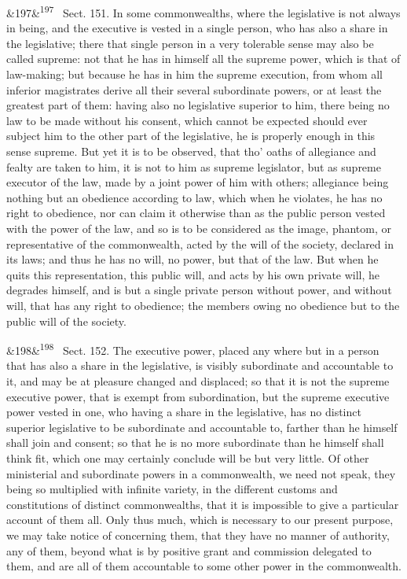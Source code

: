 \documentclass[12pt]{article}
\newcommand{\para}[1][]{\par\noindent\ifx&#1&\else\textsuperscript{\footnotesize #1}~\fi}
\begin{document}
\para[197] Sect. 151. In some commonwealths, where the legislative is not always in being, and the executive is vested in a single person, who has also a share in the legislative; there that single person in a very tolerable sense may also be called supreme: not that he has in himself all the supreme power, which is that of law-making; but because he has in him the supreme execution, from whom all inferior magistrates derive all their several subordinate powers, or at least the greatest part of them: having also no legislative superior to him, there being no law to be made without his consent, which cannot be expected should ever subject him to the other part of the legislative, he is properly enough in this sense supreme. But yet it is to be observed, that tho' oaths of allegiance and fealty are taken to him, it is not to him as supreme legislator, but as supreme executor of the law, made by a joint power of him with others; allegiance being nothing but an obedience according to law, which when he violates, he has no right to obedience, nor can claim it otherwise than as the public person vested with the power of the law, and so is to be considered as the image, phantom, or representative of the commonwealth, acted by the will of the society, declared in its laws; and thus he has no will, no power, but that of the law. But when he quits this representation, this public will, and acts by his own private will, he degrades himself, and is but a single private person without power, and without will, that has any right to obedience; the members owing no obedience but to the public will of the society.

\para[198] Sect. 152. The executive power, placed any where but in a person that has also a share in the legislative, is visibly subordinate and accountable to it, and may be at pleasure changed and displaced; so that it is not the supreme executive power, that is exempt from subordination, but the supreme executive power vested in one, who having a share in the legislative, has no distinct superior legislative to be subordinate and accountable to, farther than he himself shall join and consent; so that he is no more subordinate than he himself shall think fit, which one may certainly conclude will be but very little. Of other ministerial and subordinate powers in a commonwealth, we need not speak, they being so multiplied with infinite variety, in the different customs and constitutions of distinct commonwealths, that it is impossible to give a particular account of them all. Only thus much, which is necessary to our present purpose, we may take notice of concerning them, that they have no manner of authority, any of them, beyond what is by positive grant and commission delegated to them, and are all of them accountable to some other power in the commonwealth.
\end{document}
